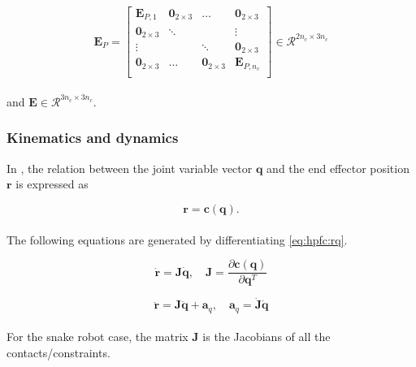\begin{equation}
    \mathbf{E}_P = 
    \begin{bmatrix}
        \mathbf{E}_{P,1} & \mathbf{0}_{2\times3} & \dots & \mathbf{0}_{2\times3} \\
        \mathbf{0}_{2\times3} & \ddots & & \vdots \\
        \vdots & & \ddots & \mathbf{0}_{2\times3} \\
        \mathbf{0}_{2\times3} & \dots & \mathbf{0}_{2\times3} & \mathbf{E}_{P,n_c} \\
    \end{bmatrix} \in \mathcal{R}^{2 n_c \times 3 n_c}
\end{equation}
\\
and $\mathbf{E} \in \mathcal{R}^{3 n_c \times 3 n_c}$.


\subsubsection{Kinematics and dynamics}

In \cite{yoshikawa1987dynamic}, the relation between the joint variable vector $\mathbf{q}$ and the end effector position $\mathbf{r}$ is expressed as

\begin{equation}\label{eq:hpfc:rq}
    \mathbf{r = c(q)}.
\end{equation}
\\
The following equations are generated by differentiating \ref{eq:hpfc:rq}.

\begin{equation}
    \mathbf{\dot{r} = J \dot{q}}, \quad \mathbf{J} = \frac{\partial \mathbf{c(q)}}{\partial \mathbf{q}^T}
\end{equation}

\begin{equation}\label{eq:dhpfc_aq}
    \mathbf{\ddot{r} = J \ddot{q}} + \mathbf{a}_q, \quad \mathbf{a}_q = \mathbf{\dot{J} \dot{q}}   
\end{equation}
\\
For the snake robot case, the matrix $\mathbf{J}$ is the Jacobians of all the contacts/constraints.


